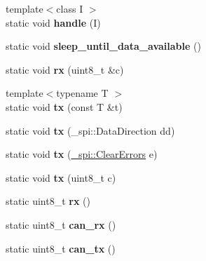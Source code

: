 \begin{DoxyCompactItemize}
\item 
{\footnotesize template$<$class I $>$ }\\static void {\bfseries handle} (I)\hypertarget{classSpiSlave_a6368b7175f34d500adfda15ea769d27d}{}\label{classSpiSlave_a6368b7175f34d500adfda15ea769d27d}

\item 
static void {\bfseries sleep\+\_\+until\+\_\+data\+\_\+available} ()\hypertarget{classSpiSlave_a22ea4c2e7dd73a8a3d4421ef1988fb6a}{}\label{classSpiSlave_a22ea4c2e7dd73a8a3d4421ef1988fb6a}

\item 
static void {\bfseries rx} (uint8\+\_\+t \&c)\hypertarget{classSpiSlave_a56024a5c65f1621d6d6878442c63d0f8}{}\label{classSpiSlave_a56024a5c65f1621d6d6878442c63d0f8}

\item 
{\footnotesize template$<$typename T $>$ }\\static void {\bfseries tx} (const T \&t)\hypertarget{classSpiSlave_a8b4d0097a955d25bed56bd828c01c2a3}{}\label{classSpiSlave_a8b4d0097a955d25bed56bd828c01c2a3}

\item 
static void {\bfseries tx} (\+\_\+spi\+::\+Data\+Direction dd)\hypertarget{classSpiSlave_aaaf2c74fb0b8332bc76e669e21ffd959}{}\label{classSpiSlave_aaaf2c74fb0b8332bc76e669e21ffd959}

\item 
static void {\bfseries tx} (\hyperlink{class__transmission_1_1ClearErrors}{\+\_\+spi\+::\+Clear\+Errors} e)\hypertarget{classSpiSlave_ac7d9643f31fede2f24a49a4491e52732}{}\label{classSpiSlave_ac7d9643f31fede2f24a49a4491e52732}

\item 
static void {\bfseries tx} (uint8\+\_\+t c)\hypertarget{classSpiSlave_a7a93c5ee67495e9e2ab89dc36e70363b}{}\label{classSpiSlave_a7a93c5ee67495e9e2ab89dc36e70363b}

\item 
static uint8\+\_\+t {\bfseries rx} ()\hypertarget{classSpiSlave_a002a0eaf01ab45db97fa956f537c6264}{}\label{classSpiSlave_a002a0eaf01ab45db97fa956f537c6264}

\item 
static uint8\+\_\+t {\bfseries can\+\_\+rx} ()\hypertarget{classSpiSlave_afd0d1035ca45ac012a54c3ff42e94985}{}\label{classSpiSlave_afd0d1035ca45ac012a54c3ff42e94985}

\item 
static uint8\+\_\+t {\bfseries can\+\_\+tx} ()\hypertarget{classSpiSlave_ae7c8db95f89ae369fd14601083dcf393}{}\label{classSpiSlave_ae7c8db95f89ae369fd14601083dcf393}


\end{DoxyCompactItemize}
